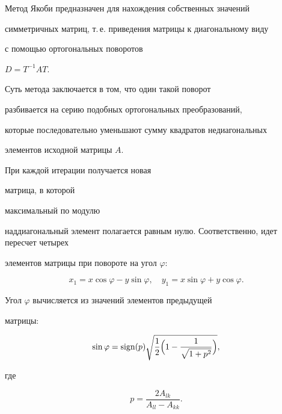 Метод Якоби предназначен для нахождения собственных значений

симметричных матриц, т.\,е. приведения матрицы к диагональному виду



с помощью ортогональных поворотов


$D = T^{-1} A T$. 

Суть метода заключается в том, что один такой поворот

разбивается на серию подобных ортогональных преобразований,

которые последовательно уменьшают сумму квадратов недиагональных

элементов исходной матрицы $A$. 

При каждой итерации получается новая

матрица, в которой 


максимальный по модулю

наддиагональный элемент полагается равным нулю. Соответственно, идет пересчет четырех


элементов матрицы при повороте на угол $\varphi$:

\begin{equation}

    x_1 = x \cos \varphi - y \sin \varphi, \quad   y_1 = x \sin \varphi + y \cos \varphi.

\end{equation}

Угол $\varphi$ вычисляется из значений элементов предыдущей


матрицы:

\begin{equation}

    \sin \varphi = \mbox{sign}(p) \sqrt{\frac{1}{2}\Bigl(1 - \frac{1}{\sqrt{1+p^2}}\Bigr)},

\end{equation} 

где

\begin{equation}

    p = \frac{2 A_{lk}}{A_{ll}-A_{kk}}.

\end{equation}



